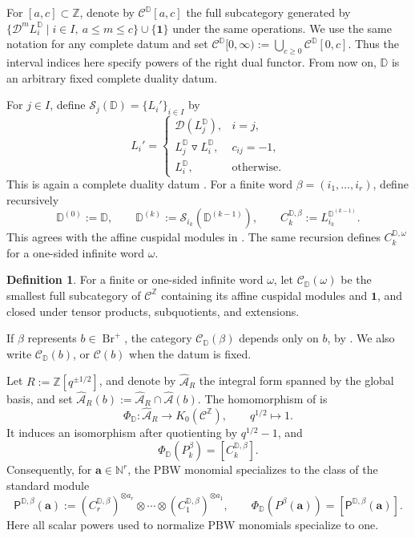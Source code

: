 \documentclass[12pt, reqno]{amsart}
\theoremstyle{plain}
\theoremstyle{definition}
\newtheorem{definition}[theorem]{Definition}
\numberwithin{equation}{section}
\newcommand{\ZZ}{\mathbb{Z}}
\newcommand{\NN}{\mathbb{N}}
\newcommand{\DD}{\mathbb{D}}
\newcommand{\cA}{\mathcal{A}}
\newcommand{\Br}{{\operatorname{Br}}}
\begin{document}
For \([a,c]\subset\ZZ\), denote by \(\mathscr C^{\DD}[a,c]\) the full
subcategory generated by \(\{\mathcal D^mL_i^{\DD}\mid
i\in I,\ a\le m\le c\}\cup\{\mathbf1\}\) under the same operations.
We use the same notation for any complete datum and set
\(\mathscr C^{\DD}[0,\infty):=\bigcup_{c\ge0}\mathscr C^{\DD}[0,c]\).
Thus the interval indices here specify powers of the right dual functor.
From now on, \(\DD\) is an arbitrary fixed complete duality datum.

For \(j\in I\), define \(\mathscr S_j(\DD)=\{L_i'\}_{i\in I}\) by
\[
L_i'=
\begin{cases}
\mathcal D(L_j^{\DD}),&i=j,\\
L_j^{\DD}\triangledown L_i^{\DD},&c_{ij}=-1,\\
L_i^{\DD},&\text{otherwise}.
\end{cases}
\]
This is again a complete duality datum
\cite[Proposition~2.11]{kashiwara2025monoidal}.
For a finite word \(\beta=(i_1,\ldots,i_r)\), define recursively
\begin{equation}\label{eq:categorical-cuspidals}
\DD^{(0)}:=\DD,\qquad
\DD^{(k)}:=\mathscr S_{i_k}(\DD^{(k-1)}),\qquad
C_k^{\DD,\beta}:=L_{i_k}^{\DD^{(k-1)}}.
\end{equation}
This agrees with the affine cuspidal modules in
\cite[Corollary~3.23 and~(4.4)]{kashiwara2025monoidal}.
The same recursion defines \(C_k^{\DD,\omega}\) for a one-sided
infinite word \(\omega\).

\begin{definition}
For a finite or one-sided infinite word \(\omega\), let
\(\mathscr C_{\DD}(\omega)\) be the smallest full subcategory of
\(\mathscr C^{\ZZ}\) containing its affine cuspidal modules and
\(\mathbf1\), and closed under tensor products, subquotients, and
extensions.
\end{definition}

If \(\beta\) represents \(b\in\Br^+\), the category
\(\mathscr C_{\DD}(\beta)\) depends only on \(b\), by
\cite[Corollary~5.34]{kashiwara2025monoidal}. We also write
\(\mathscr C_{\DD}(b)\), or \(\mathscr C(b)\) when the datum is fixed.

Let \(R:=\ZZ[q^{\pm1/2}]\), and denote by
\(\widehat{\cA}_R\) the integral form spanned by the global basis, and set
\(\widehat{\cA}_R(b):=\widehat{\cA}_R\cap\widehat{\cA}(b)\).
The homomorphism of
\cite[Proposition~3.18 and Theorem~3.19]{kashiwara2025monoidal} is
\begin{equation}\label{eq:categorical-specialization}
\Phi_{\DD}:\widehat{\cA}_R\longrightarrow K_0(\mathscr C^{\ZZ}),
\qquad q^{1/2}\longmapsto1.
\end{equation}
It induces an isomorphism after quotienting by \(q^{1/2}-1\), and
\[
\Phi_{\DD}(P_k^\beta)=[C_k^{\DD,\beta}].
\]
Consequently, for \(\mathbf a\in\NN^r\), the PBW monomial specializes
to the class of the standard module
\begin{equation}\label{eq:categorical-standard-module}
\mathsf P^{\DD,\beta}(\mathbf a):=
(C_r^{\DD,\beta})^{\otimes a_r}\otimes\cdots\otimes
(C_1^{\DD,\beta})^{\otimes a_1},
\qquad
\Phi_{\DD}(P^\beta(\mathbf a))=[\mathsf P^{\DD,\beta}(\mathbf a)].
\end{equation}
Here all scalar powers used to normalize PBW monomials specialize to one.
\end{document}

